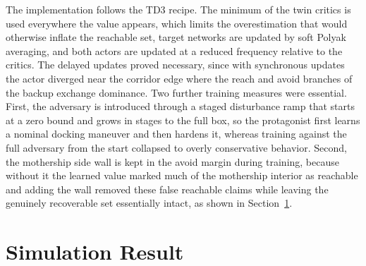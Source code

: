 \documentclass[5p,times,authoryear]{elsarticle}
\begin{document}
The implementation follows the TD3 recipe. The minimum of the twin critics is used everywhere the value appears, which limits the overestimation that would otherwise inflate the reachable set, target networks are updated by soft Polyak averaging, and both actors are updated at a reduced frequency relative to the critics. The delayed updates proved necessary, since with synchronous updates the actor diverged near the corridor edge where the reach and avoid branches of the backup exchange dominance. Two further training measures were essential. First, the adversary is introduced through a staged disturbance ramp that starts at a zero bound and grows in stages to the full box, so the protagonist first learns a nominal docking maneuver and then hardens it, whereas training against the full adversary from the start collapsed to overly conservative behavior. Second, the mothership side wall is kept in the avoid margin during training, because without it the learned value marked much of the mothership interior as reachable and adding the wall removed these false reachable claims while leaving the genuinely recoverable set essentially intact, as shown in Section~\ref{sec_results}.



\section{Simulation Result}\label{sec_results}
\end{document}
